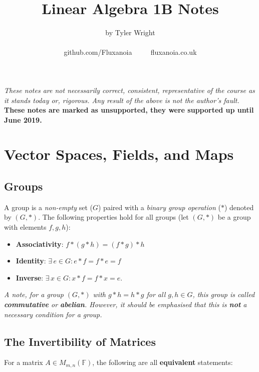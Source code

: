 \documentclass[a4paper, 12pt, twoside]{article}
\begin{document}
\title{Linear Algebra 1B Notes}
\date{}
\author{by Tyler Wright \\
  \\
  github.com/Fluxanoia $\qquad$ fluxanoia.co.uk
}
\maketitle

\vfill

\textit{These notes are not necessarily correct,
consistent, representative of the course as it stands today or, 
rigorous. Any result of the above is not the author's fault.}
\\[\baselineskip]
\textbf{These notes are marked as unsupported, they were supported
up until June 2019.}

\newpage

\section{Vector Spaces, Fields, and Maps}

\subsection{Groups}

A group is a \textit{non-empty} set ($G$) paired with a
\textit{binary group operation} ($*$) denoted by $(G, *)$.
The following properties hold for all groups (let $(G, *)$
be a group with elements $f, g, h$):

\begin{itemize}
  \item \textbf{Associativity}: $f * (g * h) = (f * g) * h$
  \item \textbf{Identity}: $\exists \, e \in G : e * f = f * e = f$
  \item \textbf{Inverse}: $\exists \, x \in G : x * f = f * x = e$.
\end{itemize}

\textit{A note, for a group $(G, *)$ with $g * h = h * g$ for all $g, h \in G$,
  this group is called \textbf{commutative} or \textbf{abelian}. However, it
  should be emphasised that this is \textbf{not} a necessary condition for
  a group.}

\subsection{The Invertibility of Matrices}

For a matrix $A \in M_{m, n}( \mathbb{F} )$, the following are all
\textbf{equivalent} statements:
\end{document}
